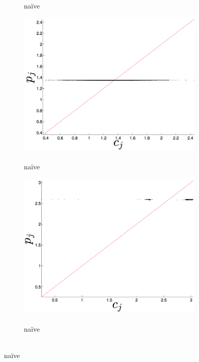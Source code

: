 \begin{figure}[htbp]
\begin{subfigure}{0.6\columnwidth}
    \caption{\col\\ na\"ive }
    \label{fig:colMEAN}
  \end{subfigure}%
   \begin{subfigure}{0.6\columnwidth}
    \includegraphics[width=\columnwidth]{figs/gccMeanForecast.png}
    \caption{\gcc\\ na\"ive }
    \label{fig:gccMEAN}
  \end{subfigure}%
     \begin{subfigure}{0.6\columnwidth}
    \includegraphics[width=\columnwidth]{figs/svdfiveMeanForecast.png}
    \caption{\svdfive\\ na\"ive }
    \label{fig:svd5MEAN}

\end{subfigure}
\end{figure}
